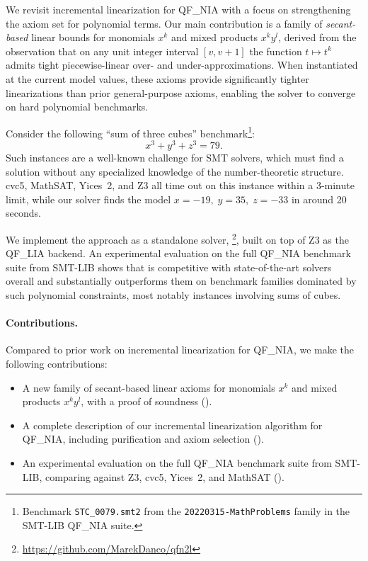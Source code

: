We revisit incremental linearization for QF\_NIA with a focus
on strengthening the axiom set for polynomial terms.
Our main contribution is a family of \emph{secant-based} linear bounds for
monomials $x^k$ and mixed products $x^k y^l$, derived from the observation
that on any unit integer interval $[v, v{+}1]$ the function $t \mapsto t^k$
admits tight piecewise-linear over- and under-approximations.
When instantiated at the current model values, these axioms provide
significantly tighter linearizations than prior general-purpose axioms,
enabling the solver to converge on hard polynomial benchmarks.

\begin{example}\label{ex:intro}
	Consider the following ``sum of three cubes'' benchmark\footnote{Benchmark
		\texttt{STC\_0079.smt2} from the \texttt{20220315-MathProblems} family in
		the SMT-LIB QF\_NIA suite.}:
	\[
		x^3 + y^3 + z^3 = 79.
	\]
	Such instances are a well-known challenge for SMT solvers, which must find
	a solution without any specialized knowledge of the number-theoretic
	structure. cvc5, MathSAT, Yices~2, and Z3 all time out on this instance
	within a 3-minute limit, while our solver finds the model
	$x = -19,\; y = 35,\; z = -33$ in around 20 seconds.
\end{example}

We implement the approach as a standalone solver,
\solver\footnote{\url{https://github.com/MarekDanco/qfn2l}}, built on
top of Z3 as the QF\_LIA backend.
An experimental evaluation on the full QF\_NIA benchmark suite from SMT-LIB
shows that \solver is competitive with state-of-the-art solvers overall
and substantially outperforms them on benchmark families dominated by
such polynomial constraints, most notably instances involving sums of cubes.

\paragraph{Contributions.}
Compared to prior work on incremental linearization for QF\_NIA,
we make the following contributions:
\begin{itemize}
	\item A new family of secant-based linear axioms for monomials $x^k$ and
	      mixed products $x^k y^l$, with a proof of soundness ().
	\item A complete description of our incremental linearization algorithm for
	      QF\_NIA, including purification and axiom selection ().
	\item An experimental evaluation on the full QF\_NIA benchmark suite from
	      SMT-LIB, comparing against Z3, cvc5, Yices~2, and MathSAT
	      ().
\end{itemize}


